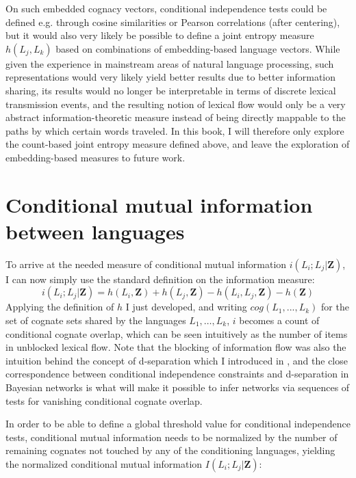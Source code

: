 On such embedded cognacy vectors, conditional independence tests could be defined e.g. through cosine similarities or Pearson correlations (after centering), but it would also very likely be possible to define a joint entropy measure $h(L_j,L_k)$ based on combinations of embedding-based language vectors. While given the experience in mainstream areas of natural language processing, such representations would very likely yield better results due to better information sharing, its results would no longer be interpretable in terms of discrete lexical transmission events, and the resulting notion of lexical flow would only be a very abstract information-theoretic measure instead of being directly mappable to the paths by which certain words traveled. In this book, I will therefore only explore the count-based joint entropy measure defined above, and leave the exploration of embedding-based measures to future work.

\section{Conditional mutual information between languages}\label{sec:6.3}
To arrive at the needed measure of conditional mutual information $i(L_i;L_j|\mathbf{Z})$, I can now simply use the standard definition on the information measure: 
\begin{equation}
 i(L_i;L_j|\mathbf{Z}) = h(L_i,\mathbf{Z}) + h(L_j,\mathbf{Z}) - h(L_i,L_j,\mathbf{Z}) - h(\mathbf{Z})
\end{equation}
Applying the definition of $h$ I just developed, and writing $cog(L_1,...,L_k)$ for the set of cognate sets shared by the languages $L_1,\dots,L_k$, $i$ becomes a count of conditional cognate overlap, which can be seen intuitively as the number of items in unblocked lexical flow. Note that the blocking of information flow was also the intuition behind the concept of d-separation which I introduced in , and the close correspondence between conditional independence constraints and d-separation in Bayesian networks is what will make it possible to infer networks via sequences of tests for vanishing conditional cognate overlap.

In order to be able to define a global threshold value for conditional independence tests, conditional mutual information needs to be normalized by the number of remaining cognates not touched by any of the conditioning languages, yielding the normalized conditional mutual information $I(L_i;L_j|\mathbf{Z})$:

